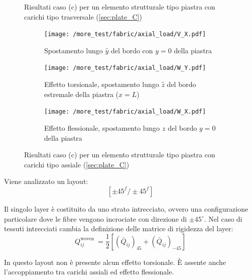\documentclass[a4paper,num-refs]{oup-contemporary}
\begin{document}
\begin{figure}[bt!]
\begin{subfigure}[t]{0.3\textwidth}
	\end{subfigure}
	\hfill
	\caption{Risultati caso (c) per un elemento strutturale tipo piastra con carichi tipo trasversale (\cref{sec:plate_C})}
	\label{fig:plate_C_transload_load}

	\centering
	
	\begin{subfigure}[t]{0.3\textwidth}
		\centering
		\texttt{[image: /more\_test/fabric/axial\_load/V\_X.pdf]}
		\caption{Spostamento lungo $\hat y$ del bordo con $y=0$ della piastra}
		
	\end{subfigure}
	\hfill
	\begin{subfigure}[t]{0.3\textwidth}
		\centering
		\texttt{[image: /more\_test/fabric/axial\_load/W\_Y.pdf]}
		
		\caption{Effetto torsionale, spostamento lungo $\hat z$ del bordo estremale della piastra ($x=L$)}
		
	\end{subfigure}
	\hfill
	\begin{subfigure}[t]{0.3\textwidth}
		\centering
		\texttt{[image: /more\_test/fabric/axial\_load/W\_X.pdf]}
		\caption{Effetto flessionale, spostamento lungo $z$ del bordo $y=0$ della piastra}
		
	\end{subfigure}
	\hfill
	\caption{Risultati caso (c) per un elemento strutturale tipo piastra con carichi tipo assiale (\cref{sec:plate_C})}
	\label{fig:plate_C_axial_load}
\end{figure}

Viene analizzato un layout:
\begin{equation}
\left[\pm 45^{f} / \pm 45^{f}\right]
\end{equation}

Il singolo layer è costituito da uno strato intrecciato, ovvero una configurazione particolare dove le fibre vengono incrociate con direzione di $\pm 45^\circ$. Nel caso di tessuti intrecciati cambia la definizione delle matrice di rigidezza del layer:
\begin{equation}
Q_{i j}^{\text {woven }}=\frac{1}{2}\left[\left(\bar{Q}_{i j}\right)_{45}+\left(\bar{Q}_{i j}\right)_{-45}\right]
\end{equation}

In questo layout non è presente alcun effetto torsionale. 
È assente anche l'accoppiamento tra carichi assiali ed effetto flessionale. 

 
\end{document}
